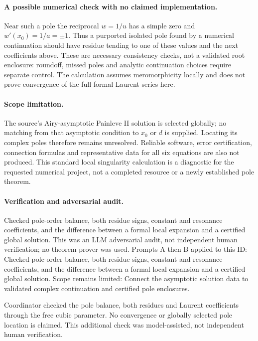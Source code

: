 \documentclass[11pt]{article}
\begin{document}
\paragraph{A possible numerical check with no claimed implementation.}Near such a pole the reciprocal \(w=1/u\) has a simple zero and \(w'(x_0)=1/a=\pm1\). Thus a purported isolated pole found by a numerical continuation should have residue tending to one of these values and the next coefficients above. These are necessary consistency checks, not a validated root enclosure: roundoff, missed poles and analytic continuation choices require separate control. The calculation assumes meromorphicity locally and does not prove convergence of the full formal Laurent series here.
\paragraph{Scope limitation.}The source's Airy-asymptotic Painleve II solution is selected globally; no matching from that asymptotic condition to \(x_0\) or \(d\) is supplied. Locating its complex poles therefore remains unresolved. Reliable software, error certification, connection formulas and representative data for all six equations are also not produced. This standard local singularity calculation is a diagnostic for the requested numerical project, not a completed resource or a newly established pole theorem.

\paragraph{Verification and adversarial audit.}
Checked pole-order balance, both residue signs, constant and resonance coefficients, and the difference between a formal local expansion and a certified global solution. This was an LLM adversarial audit, not independent human verification; no theorem prover was used. Prompts A then B applied to this ID: Checked pole-order balance, both residue signs, constant and resonance coefficients, and the difference between a formal local expansion and a certified global solution. Scope remains limited: Connect the asymptotic solution data to validated complex continuation and certified pole enclosures.

Coordinator checked the pole balance, both residues and Laurent coefficients through the free cubic parameter. No convergence or globally selected pole location is claimed. This additional check was model-assisted, not independent human verification.
\end{document}
